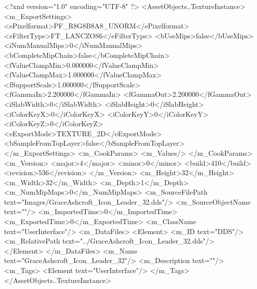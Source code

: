 <?xml version="1.0" encoding="UTF-8" ?>
<AssetObjects..TextureInstance>
	<m_ExportSettings>
		<ePixelformat>PF_R8G8B8A8_UNORM</ePixelformat>
		<eFilterType>FT_LANCZOS6</eFilterType>
		<bUseMips>false</bUseMips>
		<iNumManualMips>0</iNumManualMips>
		<bCompleteMipChain>false</bCompleteMipChain>
		<fValueClampMin>0.000000</fValueClampMin>
		<fValueClampMax>1.000000</fValueClampMax>
		<fSupportScale>1.000000</fSupportScale>
		<fGammaIn>2.200000</fGammaIn>
		<fGammaOut>2.200000</fGammaOut>
		<iSlabWidth>0</iSlabWidth>
		<iSlabHeight>0</iSlabHeight>
		<iColorKeyX>0</iColorKeyX>
		<iColorKeyY>0</iColorKeyY>
		<iColorKeyZ>0</iColorKeyZ>
		<eExportMode>TEXTURE_2D</eExportMode>
		<bSampleFromTopLayer>false</bSampleFromTopLayer>
	</m_ExportSettings>
	<m_CookParams>
		<m_Values/>
	</m_CookParams>
	<m_Version>
		<major>4</major>
		<minor>0</minor>
		<build>410</build>
		<revision>536</revision>
	</m_Version>
	<m_Height>32</m_Height>
	<m_Width>32</m_Width>
	<m_Depth>1</m_Depth>
	<m_NumMipMaps>0</m_NumMipMaps>
	<m_SourceFilePath text="Images/GraceAshcroft_Icon_Leader_32.dds"/>
	<m_SourceObjectName text=""/>
	<m_ImportedTime>0</m_ImportedTime>
	<m_ExportedTime>0</m_ExportedTime>
	<m_ClassName text="UserInterface"/>
	<m_DataFiles>
		<Element>
			<m_ID text="DDS"/>
			<m_RelativePath text="../GraceAshcroft_Icon_Leader_32.dds"/>
		</Element>
	</m_DataFiles>
	<m_Name text="GraceAshcroft_Icon_Leader_32"/>
	<m_Description text=""/>
	<m_Tags>
		<Element text="UserInterface"/>
	</m_Tags>
</AssetObjects..TextureInstance>
